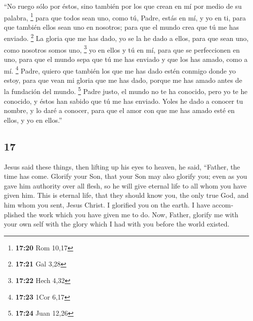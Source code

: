 \begin{paracol}{2}
 ``No ruego sólo por éstos, sino también por los que
crean en mí por medio de su palabra, \footnote{\textbf{17:20} Rom 10,17}
 para que todos sean uno, como tú, Padre, estás en mí, y
yo en ti, para que también ellos sean uno en nosotros; para que el mundo
crea que tú me has enviado. \footnote{\textbf{17:21} Gal 3,28}
 La gloria que me has dado, yo se la he dado a ellos,
para que sean uno, como nosotros somos uno, \footnote{\textbf{17:22}
  Hech 4,32}  yo en ellos y tú en mí, para que se
perfeccionen en uno, para que el mundo sepa que tú me has enviado y que
los has amado, como a mí. \footnote{\textbf{17:23} 1Cor 6,17}
 Padre, quiero que también los que me has dado estén
conmigo donde yo estoy, para que vean mi gloria que me has dado, porque
me has amado antes de la fundación del mundo. \footnote{\textbf{17:24}
  Juan 12,26}  Padre justo, el mundo no te ha conocido,
pero yo te he conocido, y éstos han sabido que tú me has enviado.
 Yoles he dado a conocer tu nombre, y lo daré a conocer,
para que el amor con que me has amado esté en ellos, y yo en ellos.''

\switchcolumn
\begin{otherlanguage}{english}

\hypertarget{section-33}{%
\section{17}\label{section-33}}

 Jesus said these things, then lifting up his eyes to
heaven, he said, ``Father, the time has come. Glorify your Son, that
your Son may also glorify you;  even as you gave him
authority over all flesh, so he will give eternal life to all whom you
have given him.  This is eternal life, that they should
know you, the only true God, and him whom you sent, Jesus Christ.
 I glorified you on the earth. I have accomplished the
work which you have given me to do.  Now, Father, glorify
me with your own self with the glory which I had with you before the
world existed.


\end{otherlanguage}
\end{paracol}
